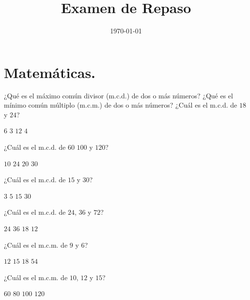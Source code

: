 \documentclass[14pt]{exam}
\title{\vspace*{-2cm}Examen de Repaso\vspace{-5ex}}
\date{\today}
\begin{document}
\maketitle

\section{Matemáticas.}

\begin{questions}
    \question ¿Qué es el máximo común divisor (m.c.d.) de dos o más números?
    \vspace{2em}
    \question ¿Qué es el mínimo común múltiplo (m.c.m.) de dos o más números?
    \vspace{2em}
    \question ¿Cuál es el m.c.d. de $18$ y $24$?
    \\[0.5em]
    \begin{oneparchoices}
        \choice $6$
        \choice $3$
        \choice $12$
        \choice $4$
    \end{oneparchoices}
    \question ¿Cuál es el m.c.d. de $60$ $100$ y $120$?
    \\[0.5em]
    \begin{oneparchoices}
        \choice $10$
        \choice $24$
        \choice $20$
        \choice $30$
    \end{oneparchoices}
    \question ¿Cuál es el m.c.d. de $15$ y $30$?
    \\[0.5em]
    \begin{oneparchoices}
        \choice $3$
        \choice $5$
        \choice $15$
        \choice $30$
    \end{oneparchoices}
    \question ¿Cuál es el m.c.d. de $24$, $36$ y $72$?
    \\[0.5em]
    \begin{oneparchoices}
        \choice $24$
        \choice $36$
        \choice $18$
        \choice $12$
    \end{oneparchoices}
    \question ¿Cuál es el m.c.m. de $9$ y $6$?
    \\[0.5em]
    \begin{oneparchoices}
        \choice $12$
        \choice $15$
        \choice $18$
        \choice $54$
    \end{oneparchoices}
    \question ¿Cuál es el m.c.m. de $10$, $12$ y $15$?
    \\[0.5em]
    \begin{oneparchoices}
        \choice $60$
        \choice $80$
        \choice $100$
        \choice $120$

\end{oneparchoices}
\end{questions}
\end{document}
